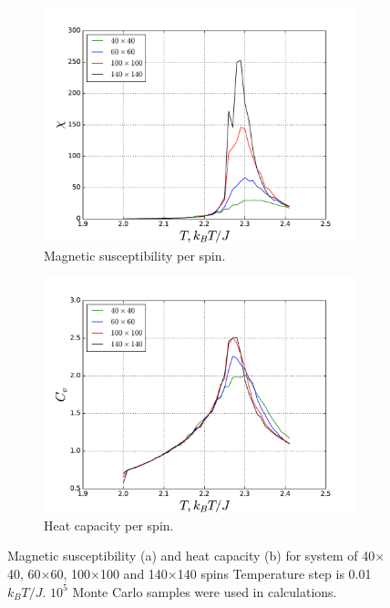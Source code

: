 \documentclass[10pt]{article}
\begin{document}
\newpage
\begin{figure}
\centering
   \begin{subfigure}[b]{1\textwidth}
   \includegraphics[width=0.9\linewidth]{phase_10_5_susceptability}
   \caption{Magnetic susceptibility per spin.}
   \label{fig:phase_suscept} 
\end{subfigure}

\begin{subfigure}[b]{1\textwidth}
   \includegraphics[width=0.9\linewidth]{phase_10_5_heat_capacity}
   \caption{Heat capacity per spin.}
   \label{fig:phase_heat_cap}
\end{subfigure}

\caption{Magnetic susceptibility (a) and heat capacity (b) for system of 40$\times$40, 60$\times$60, 100$\times$100 and 140$\times$140 spins
Temperature step is 0.01 $k_BT/J$. $10^5$ Monte Carlo samples were used in calculations.}
\end{figure}
\end{document}
